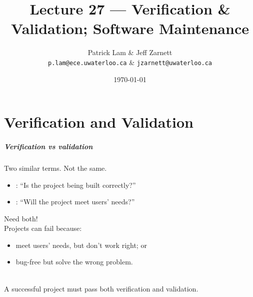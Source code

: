 
\usepackage{tikz-3dplot}

\title{Lecture 27 --- Verification \& Validation; Software Maintenance}

\author{Patrick Lam \& Jeff Zarnett \\ \small \texttt{p.lam@ece.uwaterloo.ca} \& \texttt{jzarnett@uwaterloo.ca}}
\date{\today}



\begin{frame}
  \titlepage
\end{frame}

\part{Verification and Validation}
\frame{\partpage}

\begin{frame}
\frametitle{Verification vs validation}
\begin{changemargin}{1cm}

Two similar terms. Not the same.
\begin{itemize}
\item {}: ``Is the project being built correctly?''
\item {}: ``Will the project meet users' needs?''
\end{itemize}

Need both!\\[1em]

Projects can fail because:
\begin{itemize}
\item meet users' needs, but don't work right; or
\item bug-free but solve the wrong problem.
\end{itemize}~\\

{\Large A successful project must pass both verification and validation.}
\end{changemargin}
\end{frame}

